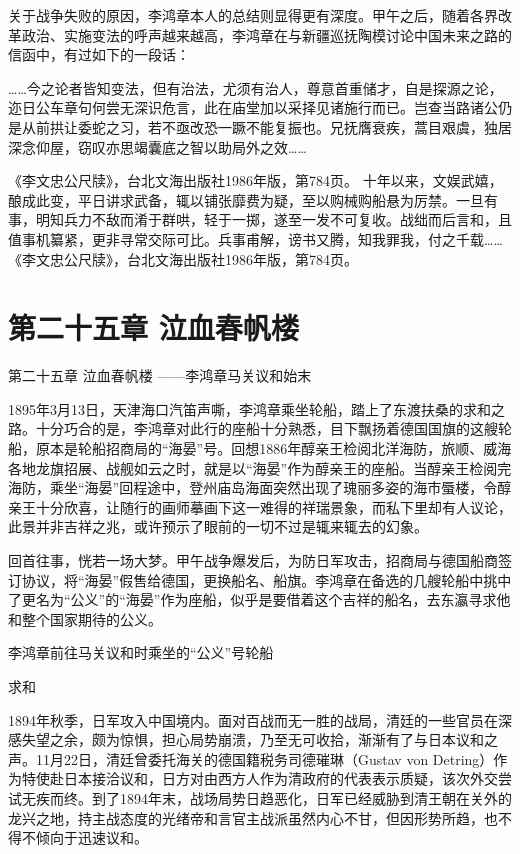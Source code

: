 \documentclass[12pt,UTF8]{ctexbook}
\begin{document}
关于战争失败的原因，李鸿章本人的总结则显得更有深度。甲午之后，随着各界改革政治、实施变法的呼声越来越高，李鸿章在与新疆巡抚陶模讨论中国未来之路的信函中，有过如下的一段话：

……今之论者皆知变法，但有治法，尤须有治人，尊意首重储才，自是探源之论，迩日公车章句何尝无深识危言，此在庙堂加以采择见诸施行而已。岂查当路诸公仍是从前拱让委蛇之习，若不亟改恐一蹶不能复振也。兄抚膺衰疾，蒿目艰虞，独居深念仰屋，窃叹亦思竭囊底之智以助局外之效……

《李文忠公尺牍》，台北文海出版社1986年版，第784页。
十年以来，文娱武嬉，酿成此变，平日讲求武备，辄以铺张靡费为疑，至以购械购船悬为厉禁。一旦有事，明知兵力不敌而淆于群哄，轻于一掷，遂至一发不可复收。战绌而后言和，且值事机纂紧，更非寻常交际可比。兵事甫解，谤书又腾，知我罪我，付之千载…… 《李文忠公尺牍》，台北文海出版社1986年版，第784页。

\chapter{第二十五章 泣血春帆楼}

第二十五章
泣血春帆楼
——李鸿章马关议和始末

1895年3月13日，天津海口汽笛声嘶，李鸿章乘坐轮船，踏上了东渡扶桑的求和之路。十分巧合的是，李鸿章对此行的座船十分熟悉，目下飘扬着德国国旗的这艘轮船，原本是轮船招商局的“海晏”号。回想1886年醇亲王检阅北洋海防，旅顺、威海各地龙旗招展、战舰如云之时，就是以“海晏”作为醇亲王的座船。当醇亲王检阅完海防，乘坐“海晏”回程途中，登州庙岛海面突然出现了瑰丽多姿的海市蜃楼，令醇亲王十分欣喜，让随行的画师摹画下这一难得的祥瑞景象，而私下里却有人议论，此景并非吉祥之兆，或许预示了眼前的一切不过是辄来辄去的幻象。

回首往事，恍若一场大梦。甲午战争爆发后，为防日军攻击，招商局与德国船商签订协议，将“海晏”假售给德国，更换船名、船旗。李鸿章在备选的几艘轮船中挑中了更名为“公义”的“海晏”作为座船，似乎是要借着这个吉祥的船名，去东瀛寻求他和整个国家期待的公义。


李鸿章前往马关议和时乘坐的“公义”号轮船

求和

1894年秋季，日军攻入中国境内。面对百战而无一胜的战局，清廷的一些官员在深感失望之余，颇为惊惧，担心局势崩溃，乃至无可收拾，渐渐有了与日本议和之声。11月22日，清廷曾委托海关的德国籍税务司德璀琳（Gustav von Detring）作为特使赴日本接洽议和，日方对由西方人作为清政府的代表表示质疑，该次外交尝试无疾而终。到了1894年末，战场局势日趋恶化，日军已经威胁到清王朝在关外的龙兴之地，持主战态度的光绪帝和言官主战派虽然内心不甘，但因形势所趋，也不得不倾向于迅速议和。
\end{document}
